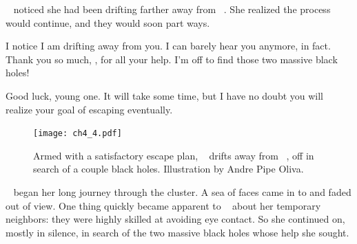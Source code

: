 \documentclass[main.tex]{subfiles}
\begin{document}
\par \nar \rmsterope~ noticed she had been drifting farther away from \rmenrico~.  She realized the process would continue, and they would soon part ways.

\par \Sterope I notice I am drifting away from you.  I can barely hear you anymore, in fact.  Thank you so much, \rmenrico, for all your help.  I'm off to find those two massive black holes!

\par \Enrico Good luck, young one.  It will take some time, but I have no doubt you will realize your goal of escaping eventually.

\begin{figure}
\texttt{[image: ch4\_4.pdf]}
\caption{Armed with a satisfactory escape plan, \rmsterope~ drifts away from \rmenrico~, off in search of a couple black holes.  Illustration by Andre Pipe Oliva.
\label{fig:fig1}}
\end{figure}

\par \nar \rmsterope~ began her long journey through the cluster.  A sea of faces came in to and faded out of view.  One thing quickly became apparent to \rmsterope~ about her temporary neighbors:  they were highly skilled at avoiding eye contact.  So she continued on, mostly in silence, in search of the two massive black holes whose help she sought.
\end{document}

